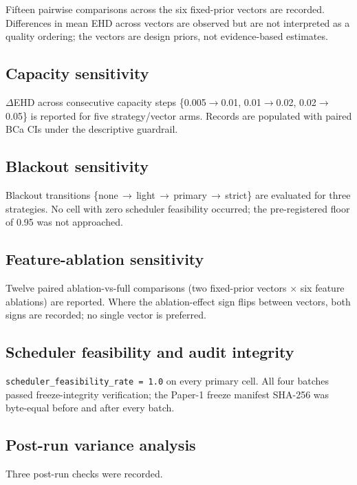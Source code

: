 Fifteen pairwise comparisons across the six fixed-prior vectors are recorded. Differences in mean EHD across vectors are observed but are not interpreted as a quality ordering; the vectors are design priors, not evidence-based estimates.

\subsection{Capacity sensitivity}

$\Delta$EHD across consecutive capacity steps \{0.005$\to$0.01, 0.01$\to$0.02, 0.02$\to$0.05\} is reported for five strategy/vector arms. Records are populated with paired BCa CIs under the descriptive guardrail.

\subsection{Blackout sensitivity}

Blackout transitions \{none\,$\to$\,light\,$\to$\,\allowbreak primary\,$\to$\,strict\} are evaluated for three strategies. No cell with zero scheduler feasibility occurred; the pre-registered floor of 0.95 was not approached.

\subsection{Feature-ablation sensitivity}

Twelve paired ablation-vs-full comparisons (two fixed-prior vectors $\times$ six feature ablations) are reported. Where the ablation-effect sign flips between vectors, both signs are recorded; no single vector is preferred.

\subsection{Scheduler feasibility and audit integrity}

\texttt{scheduler\_feasibility\_rate = 1.0} on every primary cell. All four batches passed freeze-integrity verification; the Paper-1 freeze manifest SHA-256 was byte-equal before and after every batch.

\subsection{Post-run variance analysis}

Three post-run checks were recorded.

